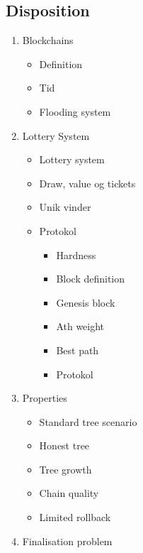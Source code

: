 \documentclass[a4, english]{article}
\begin{document}
\subsection{Disposition}
\begin{enumerate}
	\item Blockchains
  \begin{itemize}
  	\item Definition
    \item Tid
    \item Flooding system
  \end{itemize}
  \item Lottery System
  \begin{itemize}
  	\item Lottery system
    \item Draw, value og tickets
    \item Unik vinder
    \item Protokol
    \begin{itemize}
    	\item Hardness  
      \item Block definition
      \item Genesis block
      \item Ath weight
      \item Best path
      \item Protokol
    \end{itemize}
  \end{itemize}
  \item Properties
  \begin{itemize}
    \item Standard tree scenario
    \item Honest tree
  	\item Tree growth
    \item Chain quality
    \item Limited rollback
  \end{itemize}
  \item Finalisation problem
\end{enumerate}
\newpage
\end{document}
